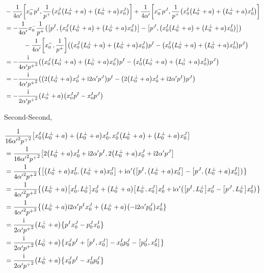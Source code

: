 \begin{align*}
    &-\frac{1}{4\alpha'}\comm{x_0^-p^I}{\frac{1}{p^+}\qty(x_0^J\qty(L_0^\perp+a)+\qty(L_0^\perp+a)x_0^J)}+\frac{1}{4\alpha'}\comm{x_0^-p^J}{\frac{1}{p^+}\qty(x_0^I\qty(L_0^\perp+a)+\qty(L_0^\perp+a)x_0^I)}\\
    &=-\frac{1}{4\alpha'}x_0^-\frac{1}{p^+}\qty(\comm{p^I}{\qty(x_0^J\qty(L_0^\perp+a)+\qty(L_0^\perp+a)x_0^J)}-\comm{p^J}{\qty(x_0^I\qty(L_0^\perp+a)+\qty(L_0^\perp+a)x_0^I)})\\
    &\quad\quad\quad-\frac{1}{4\alpha'}\comm{x_0^-}{\frac{1}{p^+}}\qty(\qty(x_0^J\qty(L_0^\perp+a)+\qty(L_0^\perp+a)x_0^J)p^I-\qty(x_0^I\qty(L_0^\perp+a)+\qty(L_0^\perp+a)x_0^I)p^J)\\
    &=-\frac{\im}{4\alpha'{p^+}^2}\qty(\qty(x_0^J\qty(L_0^\perp+a)+\qty(L_0^\perp+a)x_0^J)p^I-\qty(x_0^I\qty(L_0^\perp+a)+\qty(L_0^\perp+a)x_0^I)p^J)\\
    &=-\frac{\im}{4\alpha'{p^+}^2}\qty(\qty(2\qty(L_0^\perp+a)x_0^J+\im 2\alpha' p^J)p^I-\qty(2\qty(L_0^\perp+a)x_0^I+\im 2\alpha'p^I)p^J)\\
    &=-\frac{\im}{2\alpha'{p^+}^2}\qty(L_0^\perp+a)\qty(x_0^Jp^I-x_0^Ip^J)\\
\end{align*}

Second-Second,

\begin{align*}
    &\frac{1}{16{\alpha'}^2{p^+}^2}\comm{x_0^I\qty(L_0^\perp+a)+\qty(L_0^\perp+a)x_0^I}{x_0^J\qty(L_0^\perp+a)+\qty(L_0^\perp+a)x_0^J}\\
    &=\frac{1}{16{\alpha'}^2{p^+}^2}\comm{2\qty(L_0^\perp+a)x_0^I+\im2\alpha' p^I}{2\qty(L_0^\perp+a)x_0^J+\im2\alpha'p^J}\\
    &=\frac{1}{4{\alpha'}^2{p^+}^2}\qty{\comm{\qty(L_0^\perp+a)x_0^I}{\qty(L_0^\perp+a)x_0^J}+\im\alpha'\qty(\comm{p^I}{\qty(L_0^\perp+a)x_0^J}-\comm{p^J}{\qty(L_0^\perp+a)x_0^I})}\\
    &=\frac{1}{4{\alpha'}^2{p^+}^2}\qty{\qty(L_0^\perp+a)\comm{x_0^I}{L_0^\perp}x_0^J+\qty(L_0^\perp+a)\comm{L_0^\perp}{x_0^J}x_0^I+\im\alpha'\qty(\comm{p^I}{L_0^\perp}x_0^J-\comm{p^J}{L_0^\perp}x_0^I)}\\
    &=\frac{1}{4{\alpha'}^2{p^+}^2}\qty{\qty(L_0^\perp+a)\im 2\alpha' p^Ix_0^J+\qty(L_0^\perp+a)\qty(-\im 2\alpha' p_0^J)x_0^I}\\
    &=\frac{\im}{2{\alpha'}{p^+}^2}\qty(L_0^\perp+a)\qty{p^Ix_0^J-p_0^Jx_0^I}\\
    &=\frac{\im}{2{\alpha'}{p^+}^2}\qty(L_0^\perp+a)\qty{x_0^Jp^I+\comm{p^I}{x_0^J}-x_0^Ip_0^J-\comm{p_0^J}{x_0^I}}\\
    &=\frac{\im}{2{\alpha'}{p^+}^2}\qty(L_0^\perp+a)\qty{x_0^Jp^I-x_0^Ip_0^J}
\end{align*}

